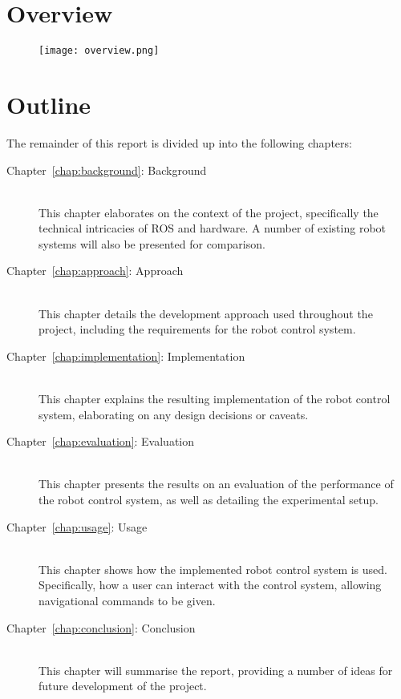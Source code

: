 \section{Overview}

\begin{figure}[h]
	\centering
	\texttt{[image: overview.png]}
\end{figure}

\section{Outline}

The remainder of this report is divided up into the following chapters:

\begin{description}
	\item[Chapter~\ref{chap:background}: Background] \hfill \\
	This chapter elaborates on the context of the project, specifically the technical intricacies of ROS and hardware. A number of existing robot systems will also be presented for comparison.

	\item[Chapter~\ref{chap:approach}: Approach] \hfill \\
	This chapter details the development approach used throughout the project, including the requirements for the robot control system.

	\item[Chapter~\ref{chap:implementation}: Implementation] \hfill \\
	This chapter explains the resulting implementation of the robot control system, elaborating on any design decisions or caveats.

	\item[Chapter~\ref{chap:evaluation}: Evaluation] \hfill \\
	This chapter presents the results on an evaluation of the performance of the robot control system, as well as detailing the experimental setup.

	\item[Chapter~\ref{chap:usage}: Usage] \hfill \\
	This chapter shows how the implemented robot control system is used. Specifically, how a user can interact with the control system, allowing navigational commands to be given.

	\item[Chapter~\ref{chap:conclusion}: Conclusion] \hfill \\
	This chapter will summarise the report, providing a number of ideas for future development of the project.
\end{description}